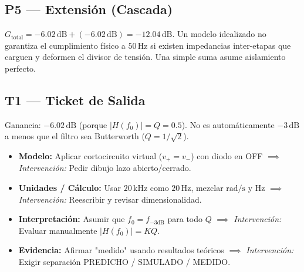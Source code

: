 \documentclass[10pt, a4paper]{article}
\begin{document}
\subsection*{P5 — Extensión (Cascada)}
$G_{\mathrm{total}} = -6.02\,\mathrm{dB} + (-6.02\,\mathrm{dB}) = \mathbf{-12.04\,\mathrm{dB}}$. Un modelo idealizado no garantiza el cumplimiento físico a $50\,\mathrm{Hz}$ si existen impedancias inter-etapas que carguen y deformen el divisor de tensión. Una simple suma asume aislamiento perfecto.

\subsection*{T1 — Ticket de Salida}
Ganancia: $\mathbf{-6.02\,\mathrm{dB}}$ (porque $|H(f_0)| = Q = 0.5$). No es automáticamente $-3\,\mathrm{dB}$ a menos que el filtro sea Butterworth ($Q=1/\sqrt{2}$).

\begin{tcolorbox}[colback=white, colframe=black, title=\textbf{Taxonomía Docente de Errores}]
    \footnotesize
    \begin{itemize}
        \setlength{\itemsep}{1pt}
        \item \textbf{Modelo:} Aplicar cortocircuito virtual ($v_+ = v_-$) con diodo en OFF $\implies$ \textit{Intervención:} Pedir dibujo lazo abierto/cerrado.
        \item \textbf{Unidades / Cálculo:} Usar $20\,\mathrm{kHz}$ como $20\,\mathrm{Hz}$, mezclar $\mathrm{rad/s}$ y $\mathrm{Hz}$ $\implies$ \textit{Intervención:} Reescribir y revisar dimensionalidad.
        \item \textbf{Interpretación:} Asumir que $f_0 = f_{-3\mathrm{dB}}$ para todo $Q$ $\implies$ \textit{Intervención:} Evaluar manualmente $|H(f_0)| = KQ$.
        \item \textbf{Evidencia:} Afirmar "medido" usando resultados teóricos $\implies$ \textit{Intervención:} Exigir separación PREDICHO / SIMULADO / MEDIDO.
    \end{itemize}
\end{tcolorbox}
\end{document}
